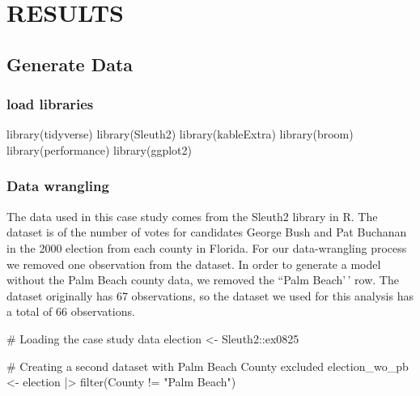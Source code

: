 \documentclass[
  letterpaper,
  DIV=11,
  numbers=noendperiod]{scrartcl}
\newenvironment{Shaded}{\begin{snugshade}}{\end{snugshade}}
\newcommand{\CommentTok}[1]{\textcolor[rgb]{0.37,0.37,0.37}{#1}}
\newcommand{\FunctionTok}[1]{\textcolor[rgb]{0.28,0.35,0.67}{#1}}
\newcommand{\NormalTok}[1]{\textcolor[rgb]{0.00,0.23,0.31}{#1}}
\newcommand{\OtherTok}[1]{\textcolor[rgb]{0.00,0.23,0.31}{#1}}
\newcommand{\SpecialCharTok}[1]{\textcolor[rgb]{0.37,0.37,0.37}{#1}}
\newcommand{\StringTok}[1]{\textcolor[rgb]{0.13,0.47,0.30}{#1}}
\begin{document}
\hypertarget{results}{%
\section{RESULTS}\label{results}}

\hypertarget{generate-data}{%
\subsection{Generate Data}\label{generate-data}}

\hypertarget{load-libraries}{%
\subsubsection{load libraries}\label{load-libraries}}

\begin{Shaded}
\begin{Highlighting}[]
\FunctionTok{library}\NormalTok{(tidyverse)}
\FunctionTok{library}\NormalTok{(Sleuth2) }
\FunctionTok{library}\NormalTok{(kableExtra)  }
\FunctionTok{library}\NormalTok{(broom)}
\FunctionTok{library}\NormalTok{(performance)}
\FunctionTok{library}\NormalTok{(ggplot2)}
\end{Highlighting}
\end{Shaded}

\hypertarget{data-wrangling}{%
\subsubsection{Data wrangling}\label{data-wrangling}}

The data used in this case study comes from the Sleuth2 library in R.
The dataset is of the number of votes for candidates George Bush and Pat
Buchanan in the 2000 election from each county in Florida. For our
data-wrangling process we removed one observation from the dataset. In
order to generate a model without the Palm Beach county data, we removed
the ``Palm Beach'\,' row. The dataset originally has 67 observations, so
the dataset we used for this analysis has a total of 66 observations.

\begin{Shaded}
\begin{Highlighting}[]
\CommentTok{\# Loading the case study data}
\NormalTok{election }\OtherTok{\textless{}{-}}\NormalTok{ Sleuth2}\SpecialCharTok{::}\NormalTok{ex0825}

\CommentTok{\# Creating a second dataset with Palm Beach County excluded}
\NormalTok{election\_wo\_pb }\OtherTok{\textless{}{-}}\NormalTok{ election }\SpecialCharTok{|\textgreater{}} \FunctionTok{filter}\NormalTok{(County }\SpecialCharTok{!=} \StringTok{"Palm Beach"}\NormalTok{)}
\end{Highlighting}
\end{Shaded}
\end{document}
